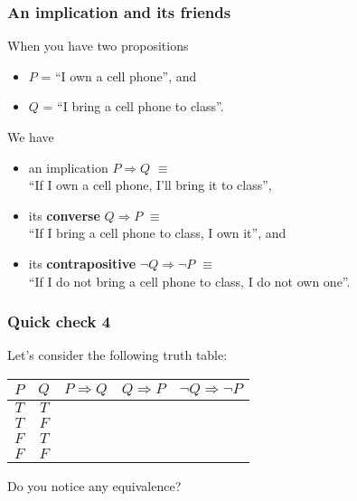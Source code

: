 \documentclass{beamer}
\begin{document}
\begin{frame}\frametitle{An implication and its friends}
  When you have two propositions
  \begin{itemize}
  \item $P$ = ``I own a cell phone'', and
  \item $Q$ = ``I bring a cell phone to class''.
  \end{itemize}
  We have
  \begin{itemize}
  \item an implication $P\Rightarrow Q$ $\equiv$ \\ ``If I own a cell phone,
    I'll bring it to class'',
  \item its {\bf converse} $Q\Rightarrow P$ $\equiv$ \\ ``If I bring a cell phone
    to class, I own it'', and
  \item its {\bf contrapositive} $\neg Q\Rightarrow\neg P$ $\equiv$ \\ ``If I do not
    bring a cell phone to class, I do not own one''.
  \end{itemize}
\end{frame}

\begin{frame}\frametitle{Quick check 4}
  Let's consider the following truth table:
  \begin{tcolorbox}
    \begin{tabular}{|c|c||c|c|c|}
      \hline
      $P$ & $Q$ & $P\Rightarrow Q$ & $Q\Rightarrow P$ & $\neg Q \Rightarrow \neg P$ \\
      \hline
      $T$ & $T$ & & & \\
      $T$ & $F$ & & & \\
      $F$ & $T$ & & & \\
      $F$ & $F$ & & & \\
      \hline
    \end{tabular}
  \end{tcolorbox}
  \pause
  Do you notice any equivalence?
\end{frame}
\end{document}
